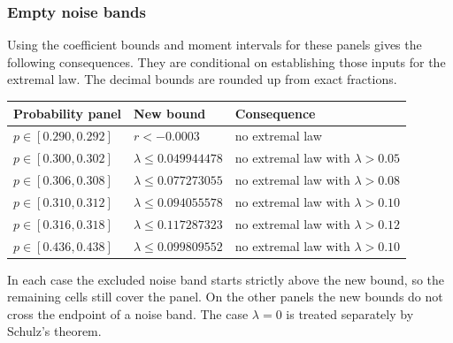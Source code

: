 \subsubsection{Empty noise bands}
Using the coefficient bounds and moment intervals for these panels gives
the following consequences. They are conditional on establishing those
inputs for the extremal law. The decimal bounds are rounded up from
exact fractions.
\begin{center}
\begin{tabular}{@{}llP{62mm}@{}}
\toprule
Probability panel & New bound & Consequence\\
\midrule
$p\in[0.290,0.292]$ & $r<-0.0003$ & no extremal law\\
$p\in[0.300,0.302]$ & $\lambda\le0.049944478$ & no extremal law with $\lambda>0.05$\\
$p\in[0.306,0.308]$ & $\lambda\le0.077273055$ & no extremal law with $\lambda>0.08$\\
$p\in[0.310,0.312]$ & $\lambda\le0.094055578$ & no extremal law with $\lambda>0.10$\\
$p\in[0.316,0.318]$ & $\lambda\le0.117287323$ & no extremal law with $\lambda>0.12$\\
$p\in[0.436,0.438]$ & $\lambda\le0.099809552$ & no extremal law with $\lambda>0.10$\\
\bottomrule
\end{tabular}
\end{center}
In each case the excluded noise band starts strictly above the new bound,
so the remaining cells still cover the panel. On the other panels the new
bounds do not cross the endpoint of a noise band. The case $\lambda=0$ is
treated separately by Schulz's theorem.
